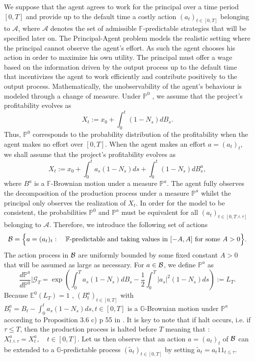 \documentclass[numbook, envcountsect, envcountsame, envcountreset, runningheads, smallextended]{article}
\def \E{\mathbb{E}}
\def \P{\mathbb{P}}
\def\Bc{{\cal B}}
\def \ind{1\!\!1}
\begin{document}
We suppose that the agent agrees to work for the principal over a time period $[0,T]$ and provide up to the default time a costly action  $(a_t)_{t \in [0,T]}$ belonging to $\mathcal A$, where $\mathcal A$ denotes the set of admissible $\mathbb{F}$-predictable strategies that will be specified later on. The Principal-Agent problem models the realistic setting where the principal cannot observe the agent's effort. As such the agent chooses his action in order to maximize his own utility. The principal must offer a wage based on the information driven by the output process up to the default time that incentivizes the agent to work efficiently and contribute positively to the output process. Mathematically, the unobservability of the agent's behaviour is modeled through a change of measure. Under $\mathbb{P}^0$ , we assume that the project’s profitability evolves as
$$ X_t := x_0 + \int_0^t (1-N_s) dB_s.$$
Thus, $\P^0$ corresponds to the probability distribution of the profitability when the agent  makes no effort over $[0,T]$. When the agent makes an effort $a=(a_t)_t$, we shall assume that the project’s profitability evolves as
$$ X_t := x_0 + \int_0^t a_s(1-N_s) ds + \int_0^t (1-N_s) dB^a_s,$$
where $B^a$ is a $\mathbb{F}$-Brownian motion under a measure $\mathbb{P}^a$.
The agent fully observes the decomposition of the production process under a measure $\mathbb{P}^a$ whilst the principal only observes the realization of $X_t$. 
 In order for the model to be consistent, the probabilities $\P^0$ and $\P^a$ must be equivalent for all $(a_t)_{t \in [0,T\wedge \tau]}$ belonging to $\mathcal A$. Therefore, we introduce the following set of actions
 $$
 \Bc=\Big\{ a=(a_t)_t : \quad\mathbb{F}\hbox{-predictable and taking values in } [-A,A] \text{ for some }A>0 \Big\}.
 $$
 The action process in $\Bc$ are uniformly bounded by some fixed constant $A>0$ that will be assumed as large as necessary.
 For $a \in \Bc$, we define $\P^a$ as
  $$ \frac{d\mathbb{P}^a}{d\mathbb{P}^0}|\mathcal{G}_T = \exp\left( \int_0^T a_s(1-N_s) dB_s - \frac{1}{2} \int_0^T |{a_s}|^2 (1-N_s)ds \right):=L_T.$$
 Because $\E^{0}(L_T)=1$ , $(B^a_t)_{t \in [0,T]}$ with $B^a_t = B_t - \int_0^t a_s (1-N_s)ds, t \in [0,T]$ is a $\mathbb{G}$-Brownian motion under $\mathbb{P}^a$ according to Proposition 3.6 c) p 55  in \cite{AksamitJeanblanc}. It is key to note that if halt occurs, i.e. if $\tau \leq T$, then the production process is halted before $T$ meaning that :
$ X^{a}_{t \wedge \tau} = X_t^a, \quad t \in [0,T]$. Let us then observe that an action $a=(a_t)_t$ of $\Bc$ can be extended to a $\mathbb{G}$-predictable process $(\tilde a_t)_{t \in [0,T]}$ by setting $\tilde a_t= a_t\ind_{t \le \tau}$. 
\end{document}
